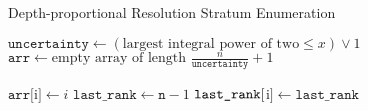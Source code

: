 \begin{algorithm}
\caption{Depth-proportional Resolution Stratum Enumeration}
\label{alg:depth-proportional-resolution-algo-enum-retained-ranks}

    \begin{algorithmic}
    \end{algorithmic}


    \begin{algorithmic}[1]
        \State $\texttt{uncertainty} \gets (\text{largest integral power of two} \le x) \lor 1$
        \State $\texttt{arr} \gets \text{empty array of length } \frac{n}{\texttt{uncertainty}} + 1$

            \State $\texttt{arr} [$i$] \gets i$
        \EndFor
        \State $\texttt{last\_rank} \gets \texttt{n} - 1$
            \State $\texttt{\texttt{last\_rank}} [$i$] \gets \texttt{last\_rank}$
        \EndIf
    \end{algorithmic}
\end{algorithm}
